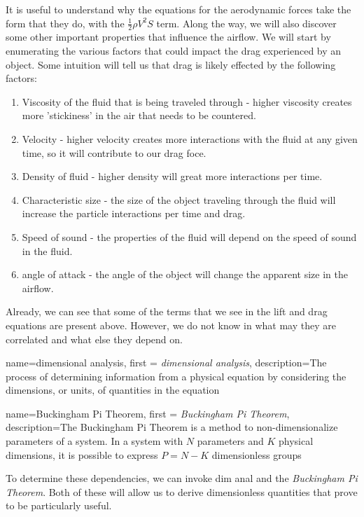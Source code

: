 \documentclass[12pt]{report}
\begin{document}
It is useful to understand why the equations for the aerodynamic forces take the form that they do, with the $\frac{1}{2}\rho V^2S$ term. Along the way, we will also discover some other important properties that influence the airflow. We will start by enumerating the various factors that could impact the drag experienced by an object. Some intuition will tell us that drag is likely effected by the following factors:
\begin{enumerate}
    \item Viscosity of the fluid that is being traveled through - higher viscosity creates more 'stickiness' in the air that needs to be countered.
    \item Velocity - higher velocity creates more interactions with the fluid at any given time, so it will contribute to our drag foce.
    \item Density of fluid - higher density will great more interactions per time.
    \item Characteristic size - the size of the object traveling through the fluid will increase the particle interactions per time and drag.
    \item Speed of sound - the properties of the fluid will depend on the speed of sound in the fluid.
    \item \gls{angle of attack} - the angle of the object will change the apparent size in the airflow.
\end{enumerate}
Already, we can see that some of the terms that we see in the lift and drag equations are present above. However, we do not know in what may they are correlated and what else they depend on.

{
    name=dimensional analysis,
    first = {\textit{dimensional analysis}},
    description={The process of determining information from a physical equation by considering the dimensions, or units, of quantities in the equation}
}

{
    name=Buckingham Pi Theorem,
    first = {\textit{Buckingham Pi Theorem}},
    description={The Buckingham Pi Theorem is a method to non-dimensionalize parameters of a system. In a system with $N$ parameters and $K$ physical dimensions, it is possible to express $P=N-K$ dimensionless groups}
}

To determine these dependencies, we can invoke \gls{dim anal} and the \textit{Buckingham Pi Theorem}. Both of these will allow us to derive dimensionless quantities that prove to be particularly useful.
\end{document}
